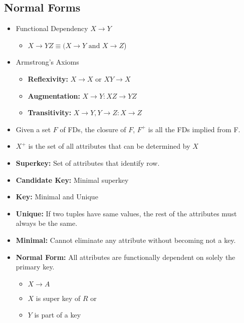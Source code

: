 \documentclass[landscape, letterpaper]{extarticle}
\begin{document}
\begin{multicols}{3}
    \section*{Normal Forms}
    \begin{itemize}[noitemsep,nolistsep]
        \item Functional Dependency \( X \rightarrow Y\)
              \begin{itemize}[noitemsep,nolistsep]
                  \item \( X \rightarrow YZ \equiv (X \rightarrow Y \text{ and } X \rightarrow Z\))
              \end{itemize}
        \item Armstrong's Axioms
              \begin{itemize}[noitemsep,nolistsep]
                  \item \textbf{Reflexivity:} \(X \rightarrow X \text{ or }XY \rightarrow X\)
                  \item \textbf{Augmentation:} \( X \rightarrow Y: XZ \rightarrow YZ\)
                  \item \textbf{Transitivity:} \( X\rightarrow Y, Y \rightarrow Z: X \rightarrow Z\)
              \end{itemize}
        \item Given a set \(F\) of FDs, the closure of \(F\), \(F^+\) is all the FDs implied from F.
        \item \(X^+\) is the set of all attributes that can be determined by \(X\)
        \item \textbf{Superkey:} Set of attributes that identify row.
        \item \textbf{Candidate Key:} Minimal superkey
        \item \textbf{Key:} Minimal and Unique
        \item \textbf{Unique:} If two tuples have same values, the rest of the attributes must always be the same.
        \item \textbf{Minimal:} Cannot eliminate any attribute without becoming not a key.
        \item \textbf{ Normal Form:} All attributes are functionally dependent on solely the primary key.
              \begin{itemize}[noitemsep,nolistsep]
                  \item \(X \rightarrow A\)
                  \item \(X\) is super key of \(R\) or
                  \item \(Y\) is part of a key

\end{itemize}
\end{itemize}
\end{multicols}
\end{document}
